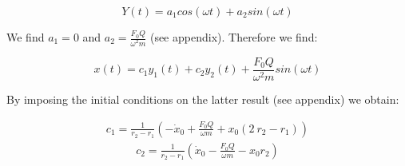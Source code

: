 \begin{equation*}
	Y(t) = a_1 cos(\omega t) + a_2 sin(\omega t)
\end{equation*}

We find $a_1 = 0$ and $a_2 = \frac{F_0 Q}{\omega^2 m}$ (see appendix). Therefore we find:

\begin{equation*}
	x(t) = c_1 y_1(t) + c_2 y_2(t) + \frac{F_0 Q}{\omega^2 m}sin(\omega t)
\end{equation*}

By imposing the initial conditions on the latter result (see appendix) we obtain:

\begin{align*}
	c_1 = \frac{1}{r_2-r_1} \left( -\dot{x}_0 + \frac{F_0 Q}{\omega m} + x_0 (2\:r_2 -r_1) \right)
\end{align*}
\begin{align*}
	c_2 = \frac{1}{r_2-r_1} \left( \dot{x}_0 - \frac{F_0 Q}{\omega m} - x_0 r_2 \right) \\
\end{align*}














